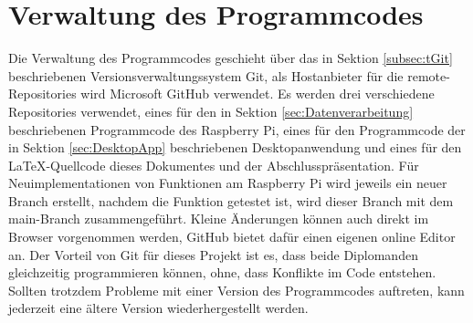 \section{Verwaltung des Programmcodes}
\label{sec:CodeVerwaltung}
Die Verwaltung des Programmcodes geschieht über das in Sektion \ref{subsec:tGit} beschriebenen Versionsverwaltungssystem Git, als Hostanbieter für die remote-Repositories wird Microsoft GitHub verwendet. Es werden drei verschiedene Repositories verwendet, eines für den in Sektion \ref{sec:Datenverarbeitung} beschriebenen Programmcode des Raspberry Pi, eines für den Programmcode der in Sektion \ref{sec:DesktopApp} beschriebenen Desktopanwendung und eines für den \LaTeX -Quellcode dieses Dokumentes und der Abschlusspräsentation. Für Neuimplementationen von Funktionen am Raspberry Pi wird jeweils ein neuer Branch erstellt, nachdem die Funktion getestet ist, wird dieser Branch mit dem main-Branch zusammengeführt. Kleine Änderungen können auch direkt im Browser vorgenommen werden, GitHub bietet dafür einen eigenen online Editor an. Der Vorteil von Git für dieses Projekt ist es, dass beide Diplomanden gleichzeitig programmieren können, ohne, dass Konflikte im Code entstehen. Sollten trotzdem Probleme mit einer Version des Programmcodes auftreten, kann jederzeit eine ältere Version wiederhergestellt werden. 